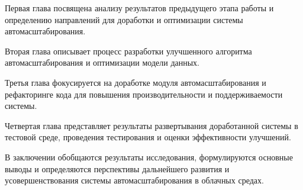 Первая глава посвящена анализу результатов предыдущего этапа работы и
определению направлений для доработки и оптимизации системы автомасштабирования.

Вторая глава описывает процесс разработки улучшенного алгоритма
автомасштабирования и оптимизации модели данных.

Третья глава фокусируется на доработке модуля автомасштабирования и рефакторинге
кода для повышения производительности и поддерживаемости системы.

Четвертая глава представляет результаты развертывания доработанной системы в
тестовой среде, проведения тестирования и оценки эффективности улучшений.

В заключении обобщаются результаты исследования, формулируются основные выводы и
определяются перспективы дальнейшего развития и усовершенствования системы
автомасштабирования в облачных средах.